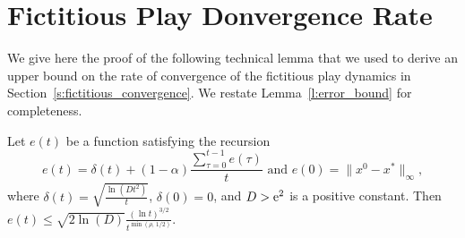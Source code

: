 \section{Fictitious Play Donvergence Rate}\label{app:s:fictitious_convergence}
We give here the proof of the following technical lemma that we used to derive
an upper bound on the rate of convergence of the fictitious play dynamics in
Section~\ref{s:fictitious_convergence}.  We restate Lemma~\ref{l:error_bound} for
completeness.
\begin{lemma}
  Let $e(t)$ be a function satisfying the recursion
  \[
    e(t) =
    \delta(t) + (1-\alpha)\frac{\sum_{\tau=0}^{t-1}e(\tau)}{t}
    \text{ and } e(0)=\|x^0 - x^*\|_{\infty},
  \]
  where \(\delta(t) = \sqrt{\frac{\ln(D t^2)}{t}} \), \(\delta(0) = 0 \),
  and $D > \mathrm{e}^2$ is a positive constant.  Then
  \(
    e(t) \leq
    \sqrt{2 \ln(D)} \frac{(\ln t)^{3/2}}{t^{\min(\rho,\, 1/2)}}.
  \)
\end{lemma}
